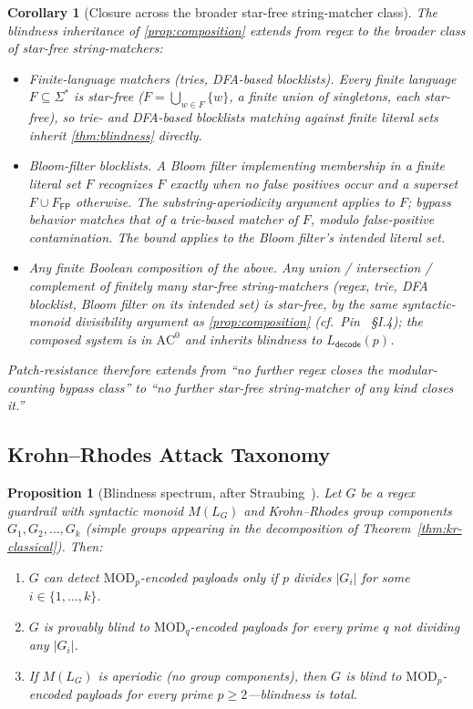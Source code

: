 \documentclass[letterpaper,twocolumn,10pt]{article}
\newtheorem{proposition}[theorem]{Proposition}
\newtheorem{corollary}[theorem]{Corollary}
\theoremstyle{definition}
\theoremstyle{remark}
\begin{document}
\begin{corollary}[Closure across the broader star-free string-matcher class]\label{cor:starfree-class-closure}
The blindness inheritance of \cref{prop:composition} extends from regex to
the broader class of star-free string-matchers:
\begin{itemize}
  \item \emph{Finite-language matchers (tries, DFA-based blocklists).}
    Every finite language $F \subseteq \Sigma^*$ is star-free
    ($F = \bigcup_{w \in F} \{w\}$, a finite union of singletons, each
    star-free), so trie- and DFA-based blocklists matching against
    finite literal sets inherit \cref{thm:blindness} directly.
  \item \emph{Bloom-filter blocklists.} A Bloom filter implementing
    membership in a finite literal set $F$ recognizes $F$ exactly when no
    false positives occur and a superset $F \cup F_{\mathsf{FP}}$
    otherwise. The substring-aperiodicity argument applies to $F$;
    bypass behavior matches that of a trie-based matcher of $F$, modulo
    false-positive contamination. The bound applies to the Bloom
    filter's \emph{intended} literal set.
  \item \emph{Any finite Boolean composition of the above.} Any union /
    intersection / complement of finitely many star-free string-matchers
    (regex, trie, DFA blocklist, Bloom filter on its intended set) is
    star-free, by the same syntactic-monoid divisibility argument as
    \cref{prop:composition} (cf.\ Pin~\cite{pin1986} \S I.4); the
    composed system is in $\mathrm{AC}^0$ and inherits blindness to
    $L_{\mathsf{decode}}(p)$.
\end{itemize}
Patch-resistance therefore extends from ``no further regex closes the
modular-counting bypass class'' to ``no further star-free
string-matcher of any kind closes it.''
\end{corollary}

\subsection{Krohn--Rhodes Attack Taxonomy}\label{sec:kr-taxonomy}

\begin{proposition}[Blindness spectrum, after Straubing~\cite{straubing1994}]\label{prop:krohn-rhodes}
Let $G$ be a regex guardrail with syntactic monoid $M(L_G)$ and Krohn--Rhodes
group components $G_1, G_2, \ldots, G_k$ (simple groups appearing in the
decomposition of Theorem~\ref{thm:kr-classical}).
Then:
\begin{enumerate}
  \item $G$ \emph{can detect} $\mathrm{MOD}_p$-encoded payloads only if
        $p$ divides $|G_i|$ for some $i \in \{1,\ldots,k\}$.
  \item $G$ is \emph{provably blind} to $\mathrm{MOD}_q$-encoded payloads for
        every prime $q$ not dividing any $|G_i|$.
  \item If $M(L_G)$ is aperiodic (no group components), then $G$ is blind to
        $\mathrm{MOD}_p$-encoded payloads for every prime $p \geq 2$---blindness
        is total.
\end{enumerate}
\end{proposition}
\end{document}
